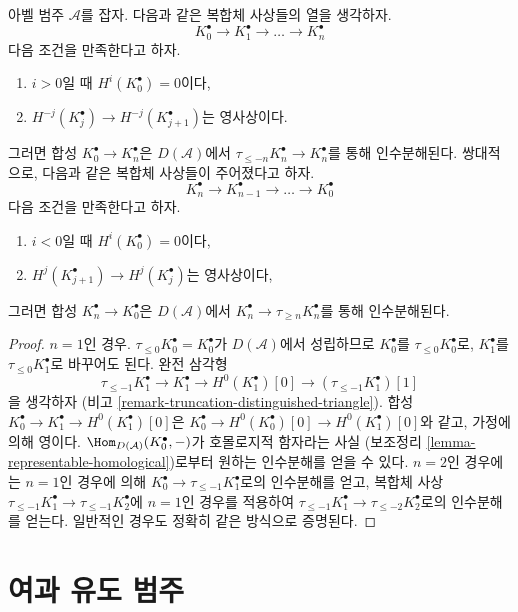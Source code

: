 \begin{lemma}
\label{lemma-trick-vanishing-composition}
아벨 범주 $\mathcal{A}$를 잡자. 다음과 같은 복합체 사상들의 열을
생각하자.
$$
K_0^\bullet \to K_1^\bullet \to \ldots \to K_n^\bullet
$$
다음 조건을 만족한다고 하자.
\begin{enumerate}
\item $i > 0$일 때 $H^i(K_0^\bullet) = 0$이다,
\item $H^{-j}(K_j^\bullet) \to H^{-j}(K_{j + 1}^\bullet)$는 영사상이다.
\end{enumerate}
그러면 합성
$K_0^\bullet \to K_n^\bullet$은 $D(\mathcal{A})$에서
$\tau_{\leq -n}K_n^\bullet \to K_n^\bullet$를 통해 인수분해된다.
쌍대적으로, 다음과 같은 복합체 사상들이 주어졌다고 하자.
$$
K_n^\bullet \to K_{n - 1}^\bullet \to \ldots \to K_0^\bullet
$$
다음 조건을 만족한다고 하자.
\begin{enumerate}
\item $i < 0$일 때 $H^i(K_0^\bullet) = 0$이다,
\item $H^j(K_{j + 1}^\bullet) \to H^j(K_j^\bullet)$는 영사상이다,
\end{enumerate}
그러면 합성 $K_n^\bullet \to K_0^\bullet$은 $D(\mathcal{A})$에서
$K_n^\bullet \to \tau_{\geq n}K_n^\bullet$를 통해 인수분해된다.
\end{lemma}

\begin{proof}
$n = 1$인 경우. $\tau_{\leq 0}K_0^\bullet = K_0^\bullet$가
$D(\mathcal{A})$에서 성립하므로 $K_0^\bullet$를 $\tau_{\leq 0}K_0^\bullet$로,
$K_1^\bullet$를 $\tau_{\leq 0}K_1^\bullet$로 바꾸어도 된다.
완전 삼각형
$$
\tau_{\leq -1}K_1^\bullet \to K_1^\bullet \to
H^0(K_1^\bullet)[0] \to (\tau_{\leq -1}K_1^\bullet)[1]
$$
을 생각하자 (비고 \ref{remark-truncation-distinguished-triangle}).
합성
$K_0^\bullet \to K_1^\bullet \to H^0(K_1^\bullet)[0]$은
$K_0^\bullet \to H^0(K_0^\bullet)[0] \to H^0(K_1^\bullet)[0]$와 같고,
가정에 의해 영이다.
$\Hom_{D(\mathcal{A})}(K_0^\bullet, -)$가 호몰로지적 함자라는 사실
(보조정리 \ref{lemma-representable-homological})로부터 원하는
인수분해를 얻을 수 있다.
$n = 2$인 경우에는 $n = 1$인 경우에 의해
$K_0^\bullet \to \tau_{\leq -1}K_1^\bullet$로의 인수분해를 얻고,
복합체 사상
$\tau_{\leq -1}K_1^\bullet \to \tau_{\leq -1}K_2^\bullet$에
$n = 1$인 경우를 적용하여
$\tau_{\leq -1}K_1^\bullet \to \tau_{\leq -2}K_2^\bullet$로의
인수분해를 얻는다.
일반적인 경우도 정확히 같은 방식으로 증명된다.
\end{proof}
\section{여과 유도 범주}
\label{section-filtered-derived-category}

